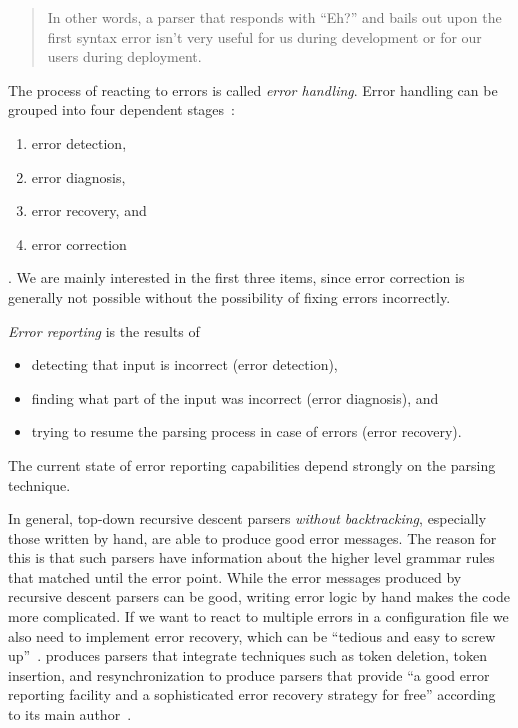 \begin{quote}
  In other words, a parser that responds with “Eh?” and bails out upon the first syntax error isn’t very useful for us during development or for our users during deployment.
\end{quote}

The process of reacting to errors is called \emph{error handling}. Error handling can be grouped into four dependent stages~\cite{ruefenacht2016error, pottier2016reachability}:

\begin{enumerate}
  \item error detection,
  \item error diagnosis,
  \item error recovery, and
  \item error correction
\end{enumerate}

. We are mainly interested in the first three items, since error correction is generally not possible without the possibility of fixing errors incorrectly.

\emph{Error reporting} is the results of

\begin{itemize}
  \item detecting that input is incorrect (error detection),
  \item finding what part of the input was incorrect (error diagnosis), and
  \item trying to resume the parsing process in case of errors (error recovery).
\end{itemize}

The current state of error reporting capabilities depend strongly on the parsing technique.

In general, top-down recursive descent parsers \emph{without backtracking}, especially those written by hand, are able to produce good error messages. The reason for this is that such parsers have information about the higher level grammar rules that matched until the error point. While the error messages produced by recursive descent parsers can be good, writing error logic by hand makes the code more complicated. If we want to react to multiple errors in a configuration file we also need to implement error recovery, which can be “tedious and easy to screw up”~\cite[p. 160]{parr2013definitive}.  produces parsers that integrate techniques such as token deletion, token insertion, and resynchronization to produce parsers that provide “a good error reporting facility and a sophisticated error recovery strategy for free” according to its main author~\cite{parr2013definitive}.

